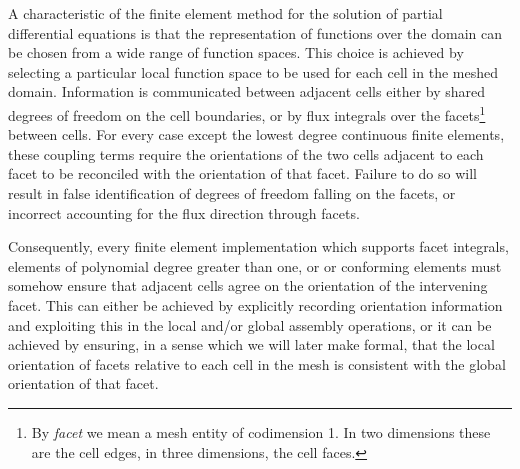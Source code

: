 \documentclass[oneeqnum,onethmnum,onefignum,onetabnum]{siamltex1213}
\newcommand{\Hdiv}{}
\newcommand{\Hcurl}{}
\begin{document}
A characteristic of the finite element method for the solution of partial
differential equations is that the representation of functions over the
domain can be chosen from a wide range of function spaces.  This choice is
achieved by selecting a particular local function space to be used for each
cell in the meshed domain. Information is communicated between adjacent
cells either by shared degrees of freedom on the cell boundaries, or by flux
integrals over the facets\footnote{By \emph{facet} we mean a mesh entity of
  codimension 1. In two dimensions these are the cell edges, in three
  dimensions, the cell faces.} between cells. For every case except the
lowest degree continuous finite elements, these coupling terms require the
orientations of the two cells adjacent to each facet to be reconciled with
the orientation of that facet. Failure to do so will result in false
identification of degrees of freedom falling on the facets, or incorrect
accounting for the flux direction through facets.

Consequently, every finite element implementation which supports facet integrals, elements
of polynomial degree greater than one, or \Hdiv{} or \Hcurl{} conforming
elements must somehow ensure that adjacent cells agree on the orientation
of the intervening facet.  This can either be achieved by explicitly
recording orientation information and exploiting this in the local and/or
global assembly operations, or it can be achieved by ensuring, in a sense
which we will later make formal, that the local orientation of facets
relative to each cell in the mesh is consistent with the global orientation
of that facet.
\end{document}
